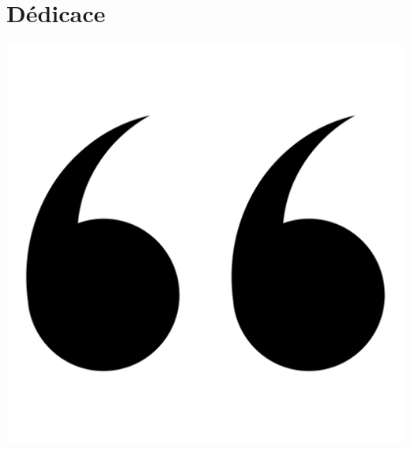 \chapter*{Dédicace}



\newcommand{\dedicationquote}[1]{%
    \begin{quote}
    \begin{center}
        \large\itshape\color{dedicationquote}
        #1
    \end{center}
    \end{quote}
}


\newcommand{\signature}[1]{%
    \begin{flushright}
        \color{signature}
        \emph{#1}
    \end{flushright}
}
\vspace{1.5cm}
\hspace{0.4cm}
\includegraphics[scale=0.02]{Images/quote2.png}
\hspace{5cm}
    
